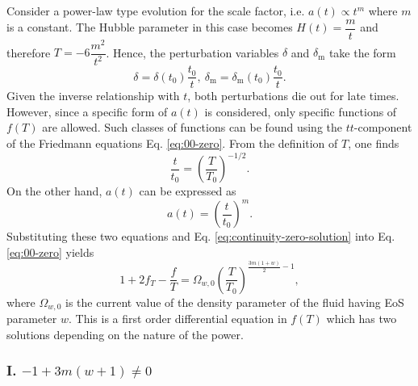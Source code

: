 \documentclass[prl,floatfix,showpacs,twocolumn,preprintnumbers,amsmath,amssymb,superscriptaddress]{revtex4}
\begin{document}
Consider a power-law type evolution for the scale factor, i.e. $a(t) \propto t^m$ where $m$ is a constant. The Hubble parameter in this case becomes $H(t) = \dfrac{m}{t}$ and therefore $T = -6\dfrac{m^2}{t^2}$. Hence, the perturbation variables $\delta$ and $\delta_{\text{m}}$ take the form
\begin{equation}
\delta = \delta\left(t_0\right) \dfrac{t_0}{t}, \: \delta_{\text{m}} = \delta_{\text{m}}\left(t_0\right) \dfrac{t_0}{t}.
\end{equation}
Given the inverse relationship with $t$, both perturbations die out for late times. However, since a specific form of $a(t)$ is considered, only specific functions of $f(T)$ are allowed. Such classes of functions can be found using the $tt$-component of the Friedmann equations Eq. \eqref{eq:00-zero}. From the definition of $T$, one finds
\begin{equation}\label{eq:tT_power_rel}
\dfrac{t}{t_0} = \left(\dfrac{T}{T_0}\right)^{-1/2}.
\end{equation}
On the other hand, $a(t)$ can be expressed as
\begin{equation}
a(t) = \left(\dfrac{t}{t_0}\right)^m.
\end{equation}
Substituting these two equations and Eq. \eqref{eq:continuity-zero-solution} into Eq. \eqref{eq:00-zero} yields
\begin{equation}
1+2f_T -\dfrac{f}{T} = \Omega_{w,0} \left(\dfrac{T}{T_0}\right)^{\frac{3m(1+w)}{2}-1},
\end{equation}
where $\Omega_{w,0}$ is the current value of the density parameter of the fluid having EoS parameter $w$. This is a first order differential equation in $f(T)$ which has two solutions depending on the nature of the power.

\subsubsection{I. $-1+3 m (w+1) \neq 0$}
\end{document}
